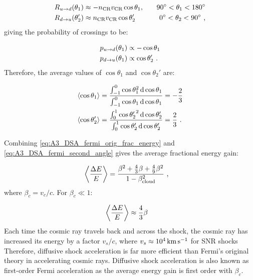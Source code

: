 \begin{alignat}{2}
    R_{u\rightarrow d}\qty(\theta_1)&\approx-n_\text{CR}v_\text{CR}\cos\theta_1,\quad &\ang{90}<\theta_1<\ang{180} \label{eq:ASA_DSA_rate_ud} \\
    R_{d\rightarrow u}\qty(\theta_2')&\approx n_\text{CR}v_\text{CR}\cos\theta_2'\quad&\ang{0}<\theta_2<\ang{90} \text{ ,}
\end{alignat}
\noindent giving the probability of crossings to be:

\begin{equation}
    \begin{aligned}
        p_{u\rightarrow d}\qty(\theta_1)&\propto -\cos\theta_1 \\
        p_{d\rightarrow u}\qty(\theta_1)&\propto \cos\theta_2'  \text{ .}
    \end{aligned}
\end{equation}
\noindent Therefore, the average values of $\cos\theta_1$ and $\cos\theta_2'$ are:

\begin{equation}
    \begin{aligned}
    \left\langle \cos\theta_1 \right\rangle&=\frac{\int_{-1}^{0} \cos\theta_1^2\dd{\cos\theta_1}}{\int_{-1}^{0}\cos\theta_1 \dd{\cos\theta_1}}=-\frac{2}{3} \\
    \left\langle \cos\theta_2' \right\rangle&=\frac{\int_{0}^{1} {\cos\theta_2'}^2\dd{\cos\theta_2'}}{\int_{0}^{1}\cos\theta_2' \dd{\cos\theta_2'}}=\frac{2}{3}\text{ .}
    \end{aligned} \label{eq:A3_DSA_fermi_second_angle}
\end{equation}

\noindent Combining \autoref{eq:A3_DSA_fermi_orig_frac_energy} and \autoref{eq:A3_DSA_fermi_second_angle} gives the average fractional energy gain:

\begin{equation}
    \begin{aligned}
    \left\langle \frac{\Delta E}{E} \right\rangle
	&=\frac{\beta^2+\frac{4}{3}\beta+\frac{4}{9}\beta^2}{1-\beta_\text{cloud}^2}\text{ ,}
    \end{aligned} 
\end{equation}
\noindent where $\beta_c=v_c/c$. For $\beta_c\ll 1$:

\begin{equation}
    \begin{aligned}
    \left\langle \frac{\Delta E}{E} \right\rangle
	&\approx \frac{4}{3}\beta 
    \end{aligned} 
\end{equation}
\noindent Each time the cosmic ray travels back and across the shock, the cosmic ray has increased its energy by a factor $v_s/c$, where $v_s\approx 10^4\,\si{\kilo\meter\per\second}$ for SNR shocks Therefore, diffusive shock acceleration is far more efficient than Fermi's original theory in accelerating cosmic rays.  Diffusive shock acceleration is also known as first-order Fermi acceleration as the average energy gain is first order with $\beta_c$. 

